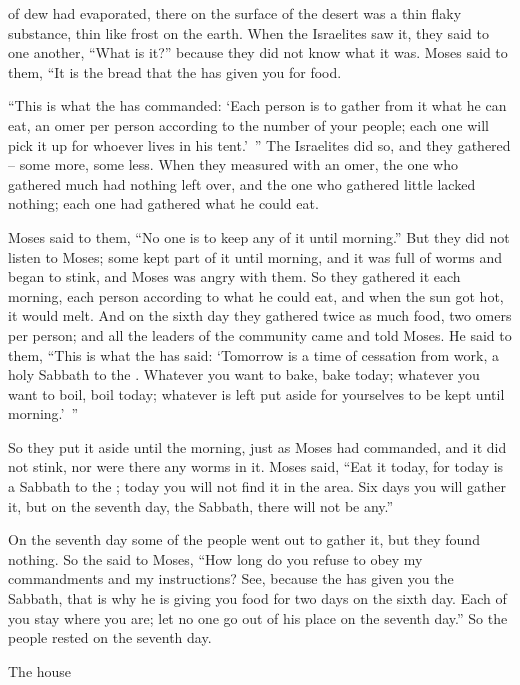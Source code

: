 {of dew
had evaporated,
there on
the surface
of the desert
was a thin
flaky substance,
thin
like frost
on
the earth.
When
the Israelites
saw it, they said
to one
another, “What is it?” because
they did not
know
what
it was.
Moses
said
to
them, “It is
the bread
that
the {}
has given
you for food.
\par }{\PP {}“This
is what
the {}
has
commanded:
 ‘Each person
is to gather
from
it what
he can eat,
an omer
per person
according to the number
of your people; each
one will pick
it up for whoever lives in his tent.’ ”
The Israelites
did
so,
and they gathered
– some more,
some less.
When they measured
with an omer,
the one who gathered
much
had
nothing
left over,
and the one who gathered little
lacked
nothing; each
one had gathered
what
he could eat.
\par }{\PP {}Moses
said
to them,
“No
one
is to keep
any
of it until
morning.”
But they did not
listen
to
Moses;
some
kept part
of
it until
morning,
and it was full
of worms
and began to stink,
and Moses
was angry
with them.
So they gathered
it each morning,
each person
according
to what he could eat,
and when the sun
got hot,
it would melt.
And on
the sixth
day
they gathered
twice
as much food,
two
omers
per
person; and all
the leaders
of the community
came
and told
Moses.
He said
to
them, “This
is what
the {}
has said: ‘Tomorrow
is a time of cessation from work,
a holy
Sabbath
to the
{}. Whatever
you want to bake,
bake
today; whatever
you want to boil,
boil
today; whatever
is left
put aside
for yourselves to be kept
until
morning.’ ”
\par }{\PP {}So they put
it aside
until
the morning,
just
as Moses
had commanded,
and it did not
stink,
nor
were there any worms in it.
Moses
said,
“Eat
it today,
for
today
is a Sabbath
to the
{}; today
you will not
find
it in the area.
Six
days
you will gather
it, but on the seventh
day,
the Sabbath,
there will not
be any.”
\par }{\PP {}On
the seventh
day
some
of the people
went out
to gather
it, but they found nothing.
So the
{}
said
to
Moses,
“How long
do you refuse
to obey
my commandments
and my instructions?
See,
because
the {}
has given
you the Sabbath,
that is why
he is
giving
you food
for two days
on the sixth
day.
Each
of you stay
where you are; let no
one
go out
of his place
on
the seventh
day.”
So
the people
rested
on the seventh
day.
\par }{\PP {}The house
}
